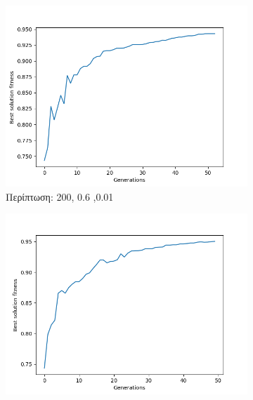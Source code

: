 \documentclass[12pt,a4paper]{article}
\begin{document}
\begin{enumerate}
\begin{figure}[H]
\begin{subfigure}[H]{0.7\textwidth}
                     \end{subfigure}
                 \end{figure}
                 \begin{figure}[H]
                     \centering
                     \begin{subfigure}[h]{0.7\textwidth}
                         \centering
                         \includegraphics[width=\textwidth]{images/7s.png}
                         \caption*{Περίπτωση: 200, 0.6 ,0.01}
                     \end{subfigure}
                     \begin{subfigure}[h]{0.7\textwidth}
                         \centering
                         \includegraphics[width=\textwidth]{images/8s.png}

\end{subfigure}
\end{figure}
\end{enumerate}
\end{document}
